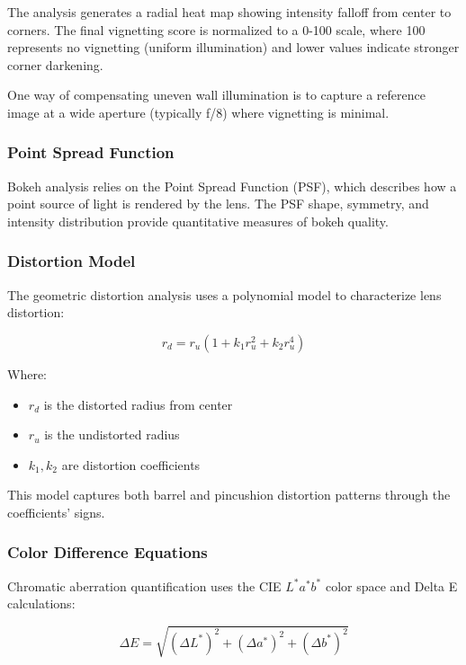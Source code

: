 The analysis generates a radial heat map showing intensity falloff from center to corners. The final vignetting score is normalized to a 0-100 scale, where 100 represents no vignetting (uniform illumination) and lower values indicate stronger corner darkening.

One way of compensating uneven wall illumination is to capture a reference image at a wide aperture (typically f/8) where vignetting is minimal.


\subsubsection{Point Spread Function}
Bokeh analysis relies on the Point Spread Function (PSF), which describes how a point source of light is rendered by the lens. The PSF shape, symmetry, and intensity distribution provide quantitative measures of bokeh quality.

\subsubsection{Distortion Model}
The geometric distortion analysis uses a polynomial model to characterize lens distortion:

\begin{equation}
r_d = r_u \left(1 + k_1 r_u^2 + k_2 r_u^4\right)
\end{equation}

Where:
\begin{itemize}
    \item \( r_d \) is the distorted radius from center
    \item \( r_u \) is the undistorted radius
    \item \( k_1, k_2 \) are distortion coefficients
\end{itemize}

This model captures both barrel and pincushion distortion patterns through the coefficients' signs.

\subsubsection{Color Difference Equations}
Chromatic aberration quantification uses the CIE \( L^*a^*b^* \) color space and Delta E calculations:

\begin{equation}
\Delta E = \sqrt{(\Delta L^*)^2 + (\Delta a^*)^2 + (\Delta b^*)^2}
\end{equation}

